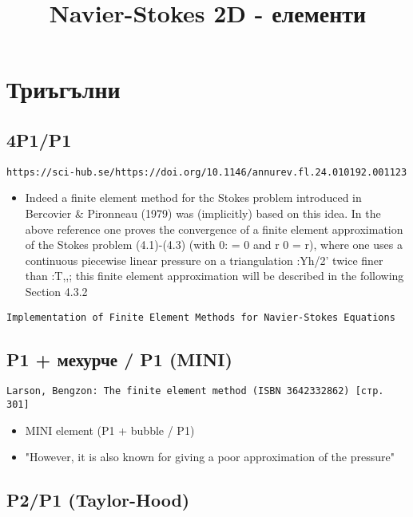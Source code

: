 \documentclass[fleqn,12pt]{article}
\title{Navier-Stokes 2D - елементи}
\begin{document}
    
\maketitle

\tableofcontents
\pagebreak

\section{Триъгълни}

\subsection{4P1/P1}
\begin{verbatim}
https://sci-hub.se/https://doi.org/10.1146/annurev.fl.24.010192.001123
\end{verbatim}
\begin{itemize}
    \item Indeed a finite element method for thc Stokes problem
    introduced in Bercovier \& Pironneau (1979) was (implicitly) based on this
    idea. In the above reference one proves the convergence of a finite element
    approximation of the Stokes problem (4.1)-(4.3) (with 0: = 0 and r 0 = r),
    where one uses a continuous piecewise linear pressure on a triangulation
    :Yh/2' twice finer than :T,,; this finite element approximation will be described
    in the following Section 4.3.2
\end{itemize}

\begin{verbatim}
Implementation of Finite Element Methods for Navier-Stokes Equations
\end{verbatim}

\subsection{P1 + мехурче / P1 (MINI)}
\begin{verbatim}
Larson, Bengzon: The finite element method (ISBN 3642332862) [стр. 301] 
\end{verbatim}
\begin{itemize}
    \item MINI element (P1 + bubble / P1)
    \item "However, it is also known for giving a poor approximation of the pressure"
\end{itemize}


\subsection{P2/P1 (Taylor-Hood)}
\end{document}
